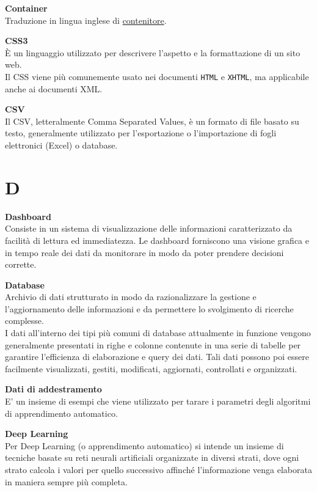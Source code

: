 \documentclass[a4paper, oneside, openany, dvipsnames, table, 12pt]{article}
\begin{document}
\textbf{Container} \\
Traduzione in lingua inglese di \hyperref[par:container]{contenitore\glo}.

\label{par:css3}
\textbf{CSS3} \\
È un linguaggio utilizzato per descrivere l’aspetto e la formattazione di un sito web. \\
Il CSS viene più comunemente usato nei documenti \texttt{HTML} e \texttt{XHTML}, ma applicabile anche ai documenti XML. 

\textbf{CSV} \\
Il CSV, letteralmente Comma Separated Values, è un formato di file basato su testo, generalmente utilizzato per l'esportazione o l'importazione di fogli elettronici (Excel) o database.

\newpage
\section{D}
\label{par:db}
\textbf{Dashboard} \\
Consiste in un sistema di visualizzazione delle informazioni caratterizzato da facilità di lettura ed immediatezza. Le dashboard forniscono una visione grafica e in tempo reale dei dati da monitorare in modo da poter prendere decisioni corrette.

\textbf{Database} \\
Archivio di dati strutturato in modo da razionalizzare la gestione e l'aggiornamento delle informazioni e da permettere lo svolgimento di ricerche complesse. \\
I dati all'interno dei tipi più comuni di database attualmente in funzione vengono generalmente presentati in righe e colonne contenute in una serie di tabelle per garantire l'efficienza di elaborazione e query dei dati. Tali dati possono poi essere facilmente visualizzati, gestiti, modificati, aggiornati, controllati e organizzati.

\textbf{Dati di addestramento} \\
E’ un insieme di esempi che viene utilizzato per tarare i parametri degli algoritmi di apprendimento automatico.


\textbf{Deep Learning} \\
Per Deep Learning (o apprendimento automatico) si intende un insieme di tecniche basate su reti neurali artificiali organizzate in diversi strati, dove ogni strato calcola i valori per quello successivo affinché l'informazione venga elaborata in maniera sempre più completa.
\end{document}
